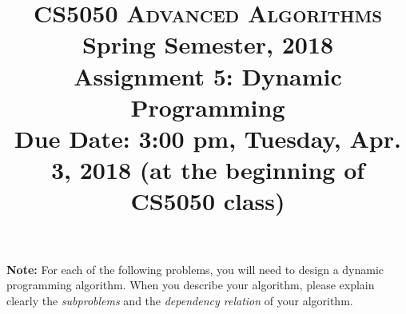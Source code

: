 \documentclass[11pt]{article}
\begin{document}
\baselineskip=14.0pt

\title{CS5050 \textsc{Advanced Algorithms}
\\{\Large Spring Semester, 2018}
\\ Assignment 5: Dynamic Programming
\\ {\large {\bf Due Date: 3:00 pm}, Tuesday, Apr. 3, 2018 ({\bf at the beginning of CS5050 class})}}
\date{}


\maketitle

\vspace{-0.6in}

\noindent
{\bf Note:} For each of the following problems, you will need to
design a dynamic programming algorithm. When you describe your algorithm,
please explain clearly the {\em subproblems} and the {\em dependency
relation} of your algorithm.
\end{document}
